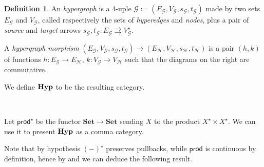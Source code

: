 \documentclass[a4paper,UKenglish,cleveref,pdftex,amsthm,thm-restate,numberwithinsect]{cas-sc}
\theoremstyle{plain}
\newtheorem{proposition}[theorem]{Proposition}
\newtheorem{corollary}[theorem]{Corollary}
\theoremstyle{definition}
\newtheorem{definition}[theorem]{Definition}
\newcommand{\Set}{\mathbf{Set}}
\def\E{\textbf {\textup{E}}}
\newcommand{\catname}[1]{\textbf{\textup{#1}}}
\newcommand{\hyp}{\catname{Hyp}}
\newcommand{\pro}{\mathsf{prod}}
\newcommand{\comm}[2]{#1\hspace{1pt} {\downarrow}#2}
\newcommand{\id}[1]{\mathsf{id}_{#1}}
\begin{document}
\noindent 
\parbox{10.8cm}{\begin{definition}An \emph{hypergraph} is a 4-uple $\mathcal{G}:=(E_\mathcal{G}, V_\mathcal{G}, s_\mathcal{G}, t_\mathcal{G})$ made by two sets $E_\mathcal{G}$ and $V_\mathcal{G}$, called respectively the sets of \emph{hyperedges} and \emph{nodes}, plus a pair of \emph{source} and \emph{target} arrows  $s_\mathcal{G}, t_\mathcal{G}\colon E_\mathcal{G}\rightrightarrows V_\mathcal{G}^\star$. 
		
\hspace{10pt} A \emph{hypergraph morphism} $(E_\mathcal{G}, V_\mathcal{G}, s_\mathcal{G}, t_\mathcal{G})\to (E_\mathcal{H}, V_\mathcal{H}, s_\mathcal{H}, t_\mathcal{H})$ is a pair $(h,k)$ of functions $h\colon E_\mathcal{G}\to E_\mathcal{H}$, $k\colon V_\mathcal{G}\to V_\mathcal{H}$ such that the diagrams on the right are commutative.

\hspace{10pt}	We define $\hyp$ to be the resulting category.
\end{definition}}\hfill\parbox{3cm}{ \hspace{1pt}\\  }

Let $\pro^\star$ be the functor $\Set\to \Set$ sending $X$ to the product $X^\star\times X^\star$.  We can use it to present $\hyp$ as a comma category.


Note that by hypothesis $(-)^\star$ preserves pullbacks, while $\pro$ is continuous by definition, 
hence by  and  we can deduce the following result.


\end{document}
